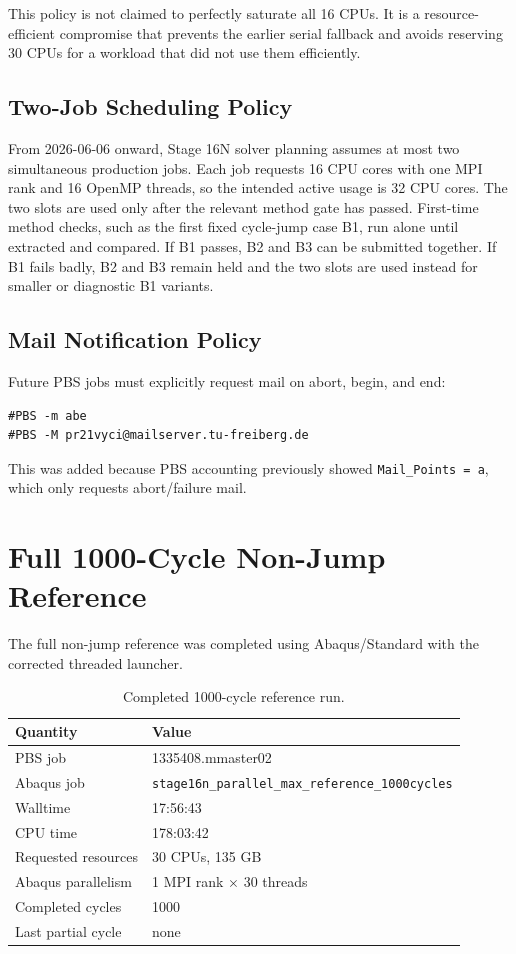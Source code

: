 \documentclass[11pt,a4paper]{article}
\newcommand{\code}[1]{\texttt{#1}}
\newcommand{\stage}{Stage 16N}
\begin{document}
This policy is not claimed to perfectly saturate all 16 CPUs. It is a resource-efficient compromise that prevents the earlier serial fallback and avoids reserving 30 CPUs for a workload that did not use them efficiently.

\subsection{Two-Job Scheduling Policy}

From 2026-06-06 onward, \stage{} solver planning assumes at most two simultaneous production jobs. Each job requests 16 CPU cores with one MPI rank and 16 OpenMP threads, so the intended active usage is 32 CPU cores. The two slots are used only after the relevant method gate has passed. First-time method checks, such as the first fixed cycle-jump case B1, run alone until extracted and compared. If B1 passes, B2 and B3 can be submitted together. If B1 fails badly, B2 and B3 remain held and the two slots are used instead for smaller or diagnostic B1 variants.

\subsection{Mail Notification Policy}

Future PBS jobs must explicitly request mail on abort, begin, and end:

\begin{verbatim}
#PBS -m abe
#PBS -M pr21vyci@mailserver.tu-freiberg.de
\end{verbatim}

This was added because PBS accounting previously showed \code{Mail\_Points = a}, which only requests abort/failure mail.

\section{Full 1000-Cycle Non-Jump Reference}

The full non-jump reference was completed using Abaqus/Standard with the corrected threaded launcher.

\begin{table}[H]
\centering
\caption{Completed 1000-cycle reference run.}
\begin{tabular}{ll}
\toprule
Quantity & Value \\
\midrule
PBS job & 1335408.mmaster02 \\
Abaqus job & \code{stage16n\_parallel\_max\_reference\_1000cycles} \\
Walltime & 17:56:43 \\
CPU time & 178:03:42 \\
Requested resources & 30 CPUs, 135 GB \\
Abaqus parallelism & 1 MPI rank $\times$ 30 threads \\
Completed cycles & 1000 \\
Last partial cycle & none \\
\bottomrule
\end{tabular}
\end{table}
\end{document}
